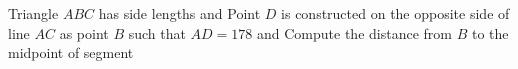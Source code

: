 Triangle $ABC$ has side lengths   and   Point $D$ is constructed on the opposite side of line $AC$ as point $B$ such that $AD=178$ and   Compute the distance from $B$ to the midpoint of segment 